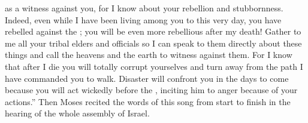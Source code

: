 {as a witness against you,
for
I
know
about your rebellion
and stubbornness.
Indeed,
even while
I have been
living
among you
to this very day,
you have rebelled
against
the {}; you will be
even
more rebellious after
my death!
Gather
to
me all
your tribal
elders
and officials
so I can speak
to them directly
about these
things
and call the heavens
and the earth
to witness against them.
For
I know
that after
I die
you will totally corrupt
yourselves
and turn
away from
the path
I have
commanded
you to walk.
Disaster
will confront you in the
days
to come
because
you will act
wickedly
before
the {}, inciting
him to anger
because of your actions.”
Then
Moses
recited
the words
of this
song
from
start to finish in the hearing
of the whole
assembly
of Israel.

\par }
